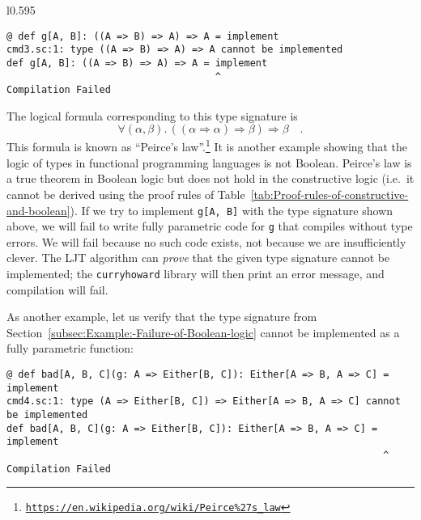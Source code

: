 \begin{wrapfigure}{l}{0.595\columnwidth}%
\vspace{-0.85\baselineskip}
\begin{lstlisting}
@ def g[A, B]: ((A => B) => A) => A = implement
cmd3.sc:1: type ((A => B) => A) => A cannot be implemented
def g[A, B]: ((A => B) => A) => A = implement
                                    ^
Compilation Failed
\end{lstlisting}

\vspace{-0.9\baselineskip}
\end{wrapfigure}%

\noindent The logical formula corresponding to this type signature
is 
\begin{equation}
\forall(\alpha,\beta).\,\left(\left(\alpha\Rightarrow\alpha\right)\Rightarrow\beta\right)\Rightarrow\beta\quad.\label{eq:ch-example-3-peirce-law}
\end{equation}
This formula is known as ``Peirce's law''.\footnote{\texttt{\href{https://en.wikipedia.org/wiki/Peirce\%27s_law}{https://en.wikipedia.org/wiki/Peirce\%27s\_law}}}
It is another example showing that the logic of types in functional
programming languages is not Boolean. Peirce's law is a true theorem
in Boolean logic but does not hold in the constructive logic (i.e.~it
cannot be derived using the proof rules of Table~\ref{tab:Proof-rules-of-constructive-and-boolean}).
If we try to implement \lstinline!g[A, B]! with the type signature
shown above, we will fail to write fully parametric code for \lstinline!g!
that compiles without type errors. We will fail because no such code
exists, \textendash{} not because we are insufficiently clever. The
LJT algorithm can \emph{prove} that the given type signature cannot
be implemented; the \texttt{curryhoward} library will then print an
error message, and compilation will fail.

As another example, let us verify that the type signature from Section~\ref{subsec:Example:-Failure-of-Boolean-logic}
cannot be implemented as a fully parametric function:
\begin{lstlisting}
@ def bad[A, B, C](g: A => Either[B, C]): Either[A => B, A => C] = implement
cmd4.sc:1: type (A => Either[B, C]) => Either[A => B, A => C] cannot be implemented
def bad[A, B, C](g: A => Either[B, C]): Either[A => B, A => C] = implement
                                                                 ^
Compilation Failed
\end{lstlisting}


